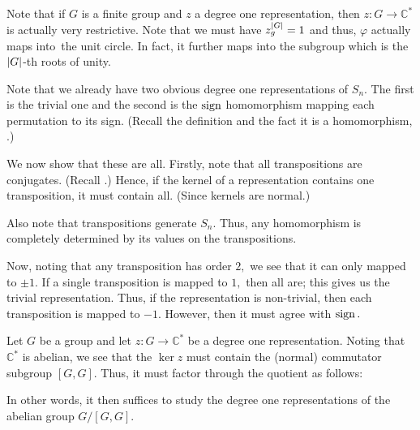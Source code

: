 \begin{rem} \label{rem:finrepintoS1}
	Note that if $G$ is a finite group and $z$ a degree one representation, then $z:G\to\mathbb{C}^*$ is actually very restrictive. Note that we must have $z_g^{{\left\lvert G \right\lvert}} = 1$ and thus, $\varphi$ actually maps into\footnotemark\ the unit circle. In fact, it further maps into the subgroup which is the ${\left\lvert G \right\lvert}$-th roots of unity.
\end{rem}

\begin{ex} \label{ex:degonerepsSn}
	Note that we already have two obvious degree one representations of $S_n.$ The first is the trivial one and the second is the $\operatorname{sign}$ homomorphism mapping each permutation to its sign. (Recall the definition  and the fact it is a homomorphism, .)

	We now show that these are all. Firstly, note that all transpositions are conjugates. (Recall .) Hence, if the kernel of a representation contains one transposition, it must contain all. (Since kernels are normal.) 

	Also note that transpositions generate $S_n.$ Thus, any homomorphism is completely determined by its values on the transpositions. 

	Now, noting that any transposition has order $2,$ we see that it can only mapped to $\pm 1.$ If a single transposition is mapped to $1,$ then all are; this gives us the trivial representation. Thus, if the representation is non-trivial, then each transposition is mapped to $-1.$ However, then it must agree with $\operatorname{sign}.$ 
\end{ex}

\begin{ex} \label{ex:deg1factorthrough}
	Let $G$ be a group and let $z : G \to \mathbb{C}^*$ be a degree one representation. Noting that $\mathbb{C}^*$ is abelian, we see that the $\ker z$ must contain the (normal) commutator subgroup $[G, G].$ Thus, it must factor through the quotient as follows:

	\begin{center}
	\end{center}

	In other words, it then suffices to study the degree one representations of the abelian group $G/[G, G].$
\end{ex}

